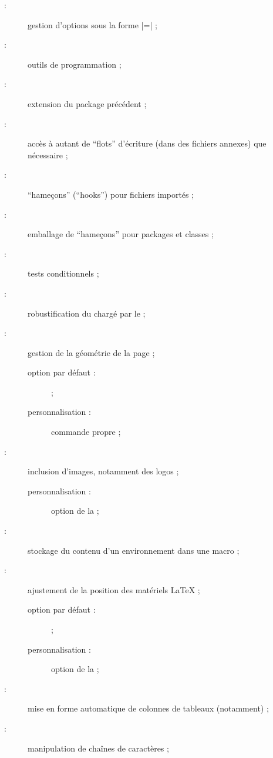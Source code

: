 \begin{description}
\item[ :] gestion d'options sous la forme
  |=| ;
\item[ :] outils de programmation ;
\item[ :] extension du package précédent ;
\item[ :] accès à autant de \enquote{flots} d'écriture
  (dans des fichiers annexes) que nécessaire ;
\item[ :] \enquote{hameçons} (\foreignquote{english}{hooks})
  pour fichiers importés ;
\item[ :] emballage de \enquote{hameçons} pour packages et
  classes ;
\item[ :] tests conditionnels ;
\item[ :] robustification du  chargé par le
   ;
\item[ :] gestion de la géométrie de la page ;
  \begin{description}
  \item[option par défaut :]  ;
  \item[personnalisation :] commande propre  ;
  \end{description}
\item[ :] inclusion d'images, notamment des logos ;
  \begin{description}
  \item[personnalisation :] option  de la \yatCl ;
  \end{description}
\item[ :] stockage du contenu d'un environnement dans une
  macro ;
\item[ :] ajustement de la position des matériels
  \LaTeX{} ;
  \begin{description}
  \item[option par défaut :]  ;
  \item[personnalisation :] option  de la \yatCl ;
  \end{description}
\item[ :] mise en forme automatique de colonnes de tableaux
  (notamment) ;
\item[ :] manipulation de chaînes de caractères ;

\end{description}
